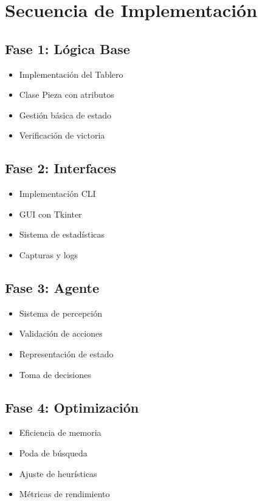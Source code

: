 \documentclass[conference]{IEEEtran}
\begin{document}
\section{Secuencia de Implementación}

\subsection{Fase 1: Lógica Base}
\begin{itemize}
	\item Implementación del Tablero
	\item Clase Pieza con atributos
	\item Gestión básica de estado
	\item Verificación de victoria
\end{itemize}

\subsection{Fase 2: Interfaces}
\begin{itemize}
	\item Implementación CLI
	\item GUI con Tkinter
	\item Sistema de estadísticas
	\item Capturas y logs
\end{itemize}

\subsection{Fase 3: Agente}
\begin{itemize}
	\item Sistema de percepción
	\item Validación de acciones
	\item Representación de estado
	\item Toma de decisiones
\end{itemize}

\subsection{Fase 4: Optimización}
\begin{itemize}
	\item Eficiencia de memoria
	\item Poda de búsqueda
	\item Ajuste de heurísticas
	\item Métricas de rendimiento
\end{itemize}
\end{document}
